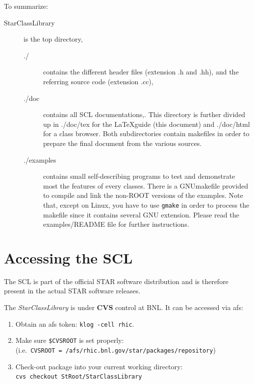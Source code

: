 \documentclass[twoside]{article}
\newcommand{\name}[1]{\textsf{#1}}%
\newcommand{\comp}[1]{\texttt{#1}}%
\begin{document}
To summarize:
\vspace{-11pt}
\begin{description}
\item[\name{StarClassLibrary}] is the top directory,
\begin{description}
\item[\name{./}] contains the different header files
    (extension \name{.h} and \name{.hh}),
and the referring source code (extension \name{.cc}),
\item[\name{./doc}] contains all SCL documentations,. This directory is
    further divided up in \name{./doc/tex} for the \LaTeX guide (this document)
    and \name{./doc/html} for a class browser. Both subdirectories
    contain makefiles in order to prepare the final document from the
    various sources.
\item[\name{./examples}] contains small self-describing programs to test and
    demonstrate most the features of every classes. There is a
    \name{GNUmakefile}
    provided to compile and link the non-ROOT versions of the examples.
    Note that, except on Linux, you have to use \comp{gmake} in order to
    process the makefile since it contains several GNU extension. Please
    read the \name{examples/README} file for further instructions.
\end{description}    
\end{description}

\section{Accessing the SCL}  

The SCL is part of the official STAR software distribution
and is therefore present in the actual STAR software releases.

The {\em StarClassLibrary} is under {\bf CVS} control at BNL.  It can
be accessed via \name{afs}:   
\begin{enumerate}
  \item Obtain an \name{afs} token: \comp{klog -cell rhic}.
  \item Make sure \comp{\$CVSROOT} is set properly:\\
    (i.e.~\comp{CVSROOT = /afs/rhic.bnl.gov/star/packages/repository})
  \item Check-out package into your current working directory:\\
    \comp{cvs checkout StRoot/StarClassLibrary}
\end{enumerate}
\end{document}
